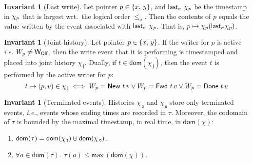 \documentclass[a4paper,UKenglish]{lipics-v2016}
\newcommand{\ie}{\emph{i.e.}\xspace}
\newcommand{\dom}[1]{\mathsf{dom}(#1)}
\newcommand{\dotcup}{\ensuremath{\mathaccent\cdot\cup}}
\newcommand{\selfsub}{\mathsf{s}}
\newcommand{\othersub}{\mathsf{o}}
\newcommand{\jointsub}{\mathsf{j}}
\newcommand{\hist}{\chi}
\newcommand{\histS}{\hist_{\, \selfsub}}
\newcommand{\histO}{\hist_{\, \othersub}}
\newcommand{\histJ}{\hist_{\, \jointsub}}
\newcommand{\hunion}{\mathbin{\dotcup}}
\newcommand{\hpts}{\mapsto}
\newcommand{\ldot}{\mathord{.}\,}
\def\ordlist{\sigma}
\newcommand{\E}{\tau}
\newcommand{\tleq}{\mathrel{\leq_\ordlist}}
\newcommand{\wInit}{\mathsf{W_{Off}}}
\newcommand{\wWrite}{\mathsf{New}}
\newcommand{\wDirty}{\mathsf{Fwd}}
\newcommand{\wClean}{\mathsf{Done}}
\newcommand{\sOn}{\mathsf{S_{On}}}
\newcommand{\sOff}{\mathsf{S_{Off}}}
\theoremstyle{definition}
\newtheorem{invariant}[theorem]{Invariant}
\begin{document}
\begin{invariant}[Last write]\label{inv:last-key}%
Let pointer $p \in \{x,\, y\}$, and $\mathsf{last}_\ordlist\ \histp$
be the timestamp in $\histp$ that is largest wrt.~the logical order
$\tleq$. Then the contents of $p$ equals the value written by the
event associated with $\mathsf{last}_\ordlist\ \histp$. That is, $p
\mapsto \histp (\mathsf{last}_\ordlist \histp)$.
\end{invariant}


\begin{invariant}[Joint history]\label{inv:joint-hist}%
Let pointer $p \in \{x,\, y\}$. If the writer for $p$ is active \ie
$\wpp \neq \wInit$, then the write event that it is performing is
timestamped and placed into joint history $\histJ$. Dually, if $t \in
\dom{\histJ}$, then the event $t$ is performed by the active writer
for $p$:
$$t \hpts (p,v) \in \histJ \iff \wpp = \wWrite\ t\, v \vee
\wpp = \wDirty\ t\, v \vee \wpp = \wClean\ t\, v $$
\end{invariant}


\begin{invariant}[Terminated events]\label{inv:dom-tau}%
Histories $\histO$ and $\histS$ store only terminated events, \ie,
events whose ending times are recorded in $\E$. Moreover, the codomain
of $\E$ is bounded by the maximal timestamp, in real time, in
$\dom{\hist}$:
\begin{enumerate}
\item $\dom{\E} = \dom{\histS} \hunion \dom{\histO}$.
\item $\forall a \in \dom{\E}\ldot\ \E(a) \leq
  \mathsf{max}\ (\dom{\hist})$.
\end{enumerate}
\end{invariant}

\end{document}
